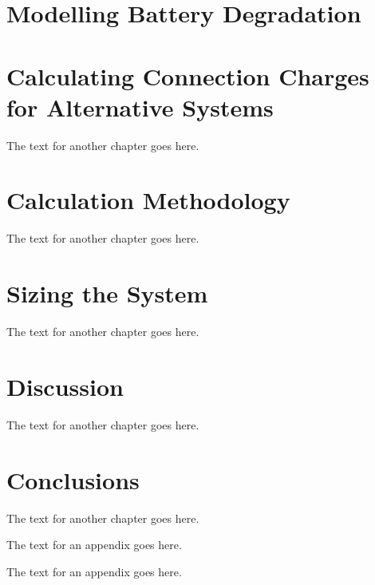 \documentclass[a4paper]{18monthreport}
\begin{document}
\chapter{Modelling Battery Degradation}
\label{sec:Modelling Battery Degradation}


\chapter{Calculating Connection Charges for Alternative Systems}
The text for another chapter goes here.

\chapter{Calculation Methodology}
The text for another chapter goes here.

\chapter{Sizing the System}
The text for another chapter goes here.

\chapter{Discussion}
The text for another chapter goes here.

\chapter{Conclusions}
The text for another chapter goes here.


\appendix{}
The text for an appendix goes here.

\appendix{}
The text for an appendix goes here.

\backmatter
{}

\end{document}
